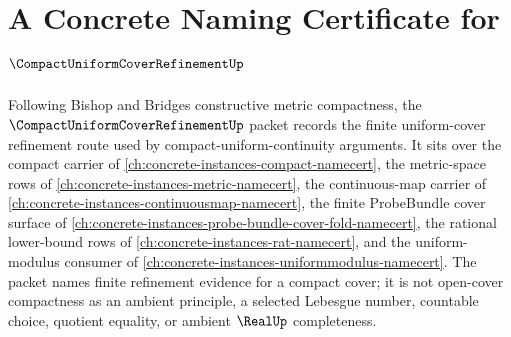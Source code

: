 \chapter{A Concrete Naming Certificate for $\CompactUniformCoverRefinementUp$}
\label{ch:concrete-instances-compact-uniform-cover-refinement-namecert}

Following Bishop and Bridges constructive metric compactness, the $\CompactUniformCoverRefinementUp$ packet records the finite uniform-cover refinement route used by compact-uniform-continuity arguments. It sits over the compact carrier of \autoref{ch:concrete-instances-compact-namecert}, the metric-space rows of \autoref{ch:concrete-instances-metric-namecert}, the continuous-map carrier of \autoref{ch:concrete-instances-continuousmap-namecert}, the finite ProbeBundle cover surface of \autoref{ch:concrete-instances-probe-bundle-cover-fold-namecert}, the rational lower-bound rows of \autoref{ch:concrete-instances-rat-namecert}, and the uniform-modulus consumer of \autoref{ch:concrete-instances-uniformmodulus-namecert}. The packet names finite refinement evidence for a compact cover; it is not open-cover compactness as an ambient principle, a selected Lebesgue number, countable choice, quotient equality, or ambient $\RealUp$ completeness.

